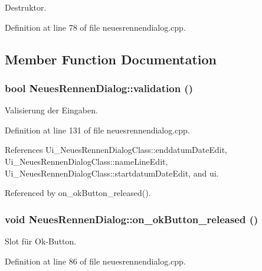 Destruktor. 



Definition at line 78 of file neuesrennendialog.cpp.

\subsection{Member Function Documentation}
\hypertarget{class_neues_rennen_dialog_2a7c2e07dff84aca530f7d0d048ba99f}{
\subsubsection[validation]{\setlength{\rightskip}{0pt plus 5cm}bool NeuesRennenDialog::validation ()}}
\label{class_neues_rennen_dialog_2a7c2e07dff84aca530f7d0d048ba99f}


Valisierung der Eingaben. 



Definition at line 131 of file neuesrennendialog.cpp.

References Ui\_\-NeuesRennenDialogClass::enddatumDateEdit, Ui\_\-NeuesRennenDialogClass::nameLineEdit, Ui\_\-NeuesRennenDialogClass::startdatumDateEdit, and ui.

Referenced by on\_\-okButton\_\-released().\hypertarget{class_neues_rennen_dialog_d956cb6fec2452e2d2fc4f21ef1ff63c}{
\subsubsection[on\_\-okButton\_\-released]{\setlength{\rightskip}{0pt plus 5cm}void NeuesRennenDialog::on\_\-okButton\_\-released ()}}
\label{class_neues_rennen_dialog_d956cb6fec2452e2d2fc4f21ef1ff63c}


Slot für Ok-Button. 



Definition at line 86 of file neuesrennendialog.cpp.

